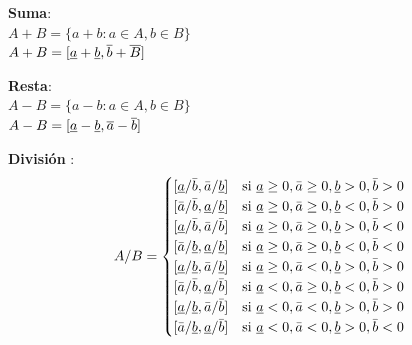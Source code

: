 \documentclass{article}
\begin{document}
\begin{flushleft}
\textbf{Suma}:
\\
$A + B = \{a + b : a \in A, b \in B \}$ \\
$A + B =[\uline a + \uline b, \overline{b} +\overline{B} ]$ \\

\end{flushleft}

\begin{flushleft}

\textbf{Resta}:
\\
$A - B = \{ a - b : a \in A, b \in B \}$ \\
$A - B =[\uline a - \uline b, \overline{a} -\overline{b} ]$ \\

\end{flushleft}

\begin{flushleft}

    \textbf{División }: \\
    
        \[
        A / B =
        \begin{cases}
        [\uline{a}/\bar{b}, \bar{a}/\uline{b}] & \text{si } \uline{a} \geq 0, \bar{a} \geq 0, \uline{b} > 0, \bar{b} > 0 \\
        [\bar{a}/\bar{b}, \uline{a}/\uline{b}] & \text{si } \uline{a} \geq 0, \bar{a} \geq 0, \uline{b} < 0, \bar{b} > 0 \\
        [\uline{a}/\bar{b}, \bar{a}/\bar{b}] & \text{si } \uline{a} \geq 0, \bar{a} \geq 0,   \uline{b} > 0, \bar{b} < 0 \\
        [\bar{a}/\uline{b}, \uline{a}/\uline{b}] & \text{si } \uline{a} \geq 0, \bar{a} \geq 0, \uline{b} < 0, \bar{b} < 0 \\
        [\uline{a}/\uline{b}, \bar{a}/\uline{b}] & \text{si } \uline{a} \geq 0, \bar{a} < 0, \uline{b} > 0, \bar{b} > 0 \\
    
        [\bar{a}/\bar{b}, \uline{a}/\bar{b}] & \text{si } \uline{a} < 0, \bar{a} \geq 0, \uline{b} < 0, \bar{b} > 0 \\
    
        [\uline{a}/\uline{b}, \bar{a}/\bar{b}] & \text{si } \uline{a} < 0, \bar{a} < 0, \uline{b} > 0, \bar{b} > 0 \\
        [\bar{a}/\uline{b}, \uline{a}/\bar{b}] & \text{si } \uline{a} < 0, \bar{a} < 0, \uline{b} > 0, \bar{b} < 0 \\
        \end{cases}
        \]
    
\end{flushleft}
\end{document}
